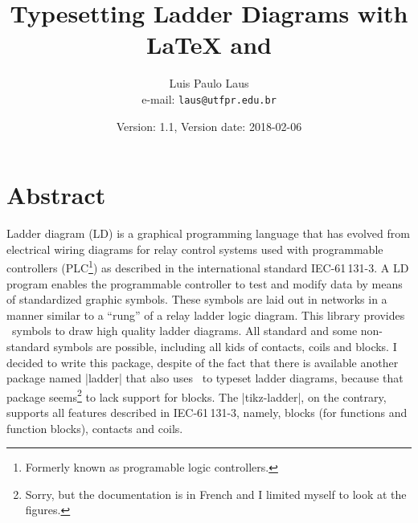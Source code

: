 \documentclass[a4paper]{ltxdoc}
\begin{document}
\title{Typesetting Ladder Diagrams with \LaTeX{} and \tikzname{}}
\author{Luis Paulo Laus\\e-mail: \texttt{laus@utfpr.edu.br}}
\date{Version: 1.1, Version date: 2018-02-06}

\maketitle

\section{Abstract}
Ladder diagram (LD) is a graphical programming language that has evolved from electrical wiring diagrams for relay control systems used with programmable controllers (PLC\footnote{Formerly known as programable logic controllers.}) as described in the international standard IEC-61\,131-3. A LD program enables the programmable controller to test and modify data by means of standardized graphic symbols. These symbols are laid out in networks in a manner similar to a ``rung'' of a relay ladder logic diagram. This library provides \tikzname\ symbols to draw high quality ladder diagrams. All standard and some non-standard symbols are possible, including all kids of contacts, coils and blocks. I decided to write this package, despite of the fact that there is available another package named |ladder| that also uses \tikzname\ to typeset ladder diagrams, because that package seems\footnote{Sorry, but the documentation is in French and I limited myself to look at the figures.} to lack support for blocks. The |tikz-ladder|, on the contrary, supports all features described in IEC-61\,131-3, namely, blocks (for functions and function blocks), contacts and coils.
\end{document}
